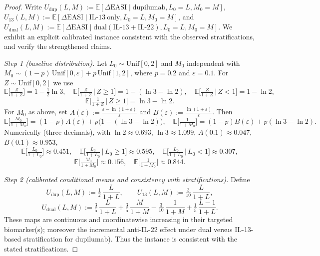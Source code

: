 \begin{proof}
Write $U_{\mathrm{dup}}(L,M):=\mathbb{E}[\Delta\mathrm{EASI}\mid\mathrm{dupilumab},L_0{=}L,M_0{=}M]$, $U_{13}(L,M):=\mathbb{E}[\Delta\mathrm{EASI}\mid\mathrm{IL\text{-}13\ only},L_0{=}L,M_0{=}M]$, and $U_{\mathrm{dual}}(L,M):=\mathbb{E}[\Delta\mathrm{EASI}\mid\mathrm{dual(IL\text{-}13{+}IL\text{-}22)},L_0{=}L,M_0{=}M]$. We exhibit an explicit calibrated instance consistent with the observed stratifications, and verify the strengthened claims.

\emph{Step 1 (baseline distribution).} Let $L_0\sim\mathrm{Unif}[0,2]$ and $M_0$ independent with $M_0\sim (1{-}p)\,\mathrm{Unif}[0,\varepsilon]+p\,\mathrm{Unif}[1,2]$, where $p=0.2$ and $\varepsilon=0.1$. For $Z\sim\mathrm{Unif}[0,2]$ we use
\[
\mathbb{E}\Big[\tfrac{Z}{1+Z}\Big]=1-\tfrac{1}{2}\ln 3,\quad \mathbb{E}\Big[\tfrac{Z}{1+Z}\,\Big|\,Z\ge 1\Big]=1-(\ln 3-\ln 2),\quad \mathbb{E}\Big[\tfrac{Z}{1+Z}\,\Big|\,Z<1\Big]=1-\ln 2,
\]
\[
\mathbb{E}\Big[\tfrac{1}{1+Z}\,\Big|\,Z\ge 1\Big]=\ln 3-\ln 2.
\]
For $M_0$ as above, set $A(\varepsilon):=\frac{\varepsilon-\ln(1+\varepsilon)}{\varepsilon}$ and $B(\varepsilon):=\frac{\ln(1+\varepsilon)}{\varepsilon}$. Then
\[
\mathbb{E}\Big[\tfrac{M_0}{1+M_0}\Big]=(1-p)A(\varepsilon)+p\big(1-(\ln 3-\ln 2)\big),\quad \mathbb{E}\Big[\tfrac{1}{1+M_0}\Big]=(1-p)B(\varepsilon)+p(\ln 3-\ln 2).
\]
Numerically (three decimals), with $\ln 2\approx0.693$, $\ln 3\approx1.099$, $A(0.1)\approx0.047$, $B(0.1)\approx0.953$,
\[
\mathbb{E}\Big[\tfrac{L_0}{1+L_0}\Big]\approx0.451,\quad \mathbb{E}\Big[\tfrac{L_0}{1+L_0}\,\Big|\,L_0\ge 1\Big]\approx0.595,\quad \mathbb{E}\Big[\tfrac{L_0}{1+L_0}\,\Big|\,L_0<1\Big]\approx0.307,
\]
\[
\mathbb{E}\Big[\tfrac{M_0}{1+M_0}\Big]\approx0.156,\quad \mathbb{E}\Big[\tfrac{1}{1+M_0}\Big]\approx0.844.
\]

\emph{Step 2 (calibrated conditional means and consistency with stratifications).} Define
\[
U_{\mathrm{dup}}(L,M):=\tfrac12\,\frac{L}{1+L},\qquad U_{13}(L,M):=\tfrac{3}{10}\,\frac{L}{1+L},
\]
\[
U_{\mathrm{dual}}(L,M):=\tfrac{3}{5}\,\frac{L}{1+L}+\tfrac{3}{5}\,\frac{M}{1+M}-\tfrac{3}{10}\,\frac{1}{1+M}+\tfrac{1}{5}\,\frac{L-1}{1+L}.
\]
These maps are continuous and coordinatewise increasing in their targeted biomarker(s); moreover the incremental anti-IL-22 effect under dual versus IL-13-based stratification for dupilumab). Thus the instance is consistent with the stated stratifications.


\end{proof}
